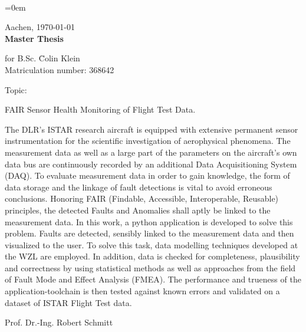 \pagestyle{empty}
~
\newpage
{}
\parindent=0em

Aachen, \verbosedate\today\\

{\huge \bf Master Thesis}\\[1cm] %


\begin{tabbing}
for B.Sc. \quad \= Colin Klein\\
\> Matriculation number: 368642\\

	
\end{tabbing}

\begin{minipage}[t]{0.1\textwidth}
Topic: %
\quad
\end{minipage}
\begin{minipage}[t]{0.9\textwidth}
	FAIR Sensor Health Monitoring of Flight Test Data.\\
\end{minipage}

The DLR's ISTAR research aircraft is equipped with extensive permanent sensor instrumentation for the scientific investigation of aerophysical phenomena. The measurement data as well as a large part of the parameters on the aircraft's own data bus are continuously recorded by an additional Data Acquisitioning System (DAQ). To evaluate measurement data in order to gain knowledge, the form of data storage and the linkage of fault detections is vital to avoid erroneous conclusions.
Honoring FAIR (Findable, Accessible, Interoperable, Reusable) principles, the detected Faults and Anomalies shall aptly be linked to the measurement data.
In this work, a python application is developed to solve this problem. Faults are detected, sensibly linked to the measurement data and then visualized to the user.
To solve this task, data modelling techniques developed at the WZL are employed. In addition, data is checked for completeness, plausibility and correctness by using statistical methods as well as approaches from the field of Fault Mode and Effect Analysis (FMEA).
The performance and trueness of the application-toolchain is then tested against known errors and validated on a dataset of ISTAR Flight Test data.
\\


\vspace{4cm}

Prof. Dr.-Ing. Robert Schmitt

